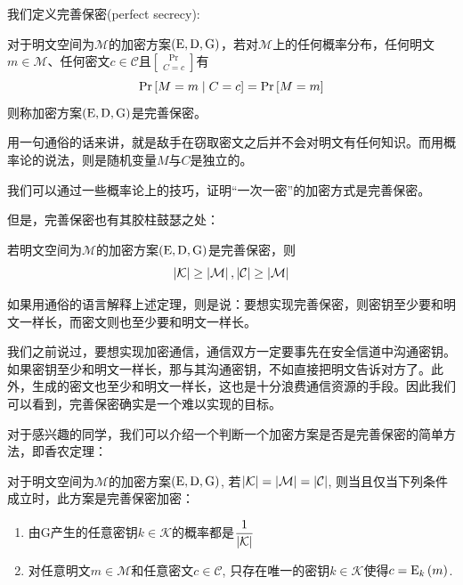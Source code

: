 我们定义完善保密(perfect secrecy):
\begin{Definition}
对于明文空间为$\mathcal{M}$的加密方案$\pth{\mathrm{E}, \mathrm{D}, \mathrm{G}}$，若对$\mathcal{M}$上的任何概率分布，任何明文$m\in\mathcal{M}$、任何密文$c\in\mathcal{C}$且$\Pr\brack{C=c}$有
\begin{equation}
    \Pr\brack{M=m\mid C=c}=\Pr\brack{M=m}
\end{equation}
则称加密方案$\pth{\mathrm{E}, \mathrm{D}, \mathrm{G}}$是完善保密。
\end{Definition}

用一句通俗的话来讲，就是敌手在窃取密文之后并不会对明文有任何知识。而用概率论的说法，则是随机变量$M$与$C$是独立的。\par
我们可以通过一些概率论上的技巧，证明“一次一密”的加密方式是完善保密。\par
但是，完善保密也有其胶柱鼓瑟之处：
\begin{theorem}
若明文空间为$\mathcal{M}$的加密方案$\pth{\mathrm{E}, \mathrm{D}, \mathrm{G}}$是完善保密，则
\begin{equation}
    \abs{\mathcal{K}}\geq\abs{\mathcal{M}}, \abs{\mathcal{C}}\geq\abs{\mathcal{M}}
\end{equation}
\end{theorem}

如果用通俗的语言解释上述定理，则是说：要想实现完善保密，则密钥至少要和明文一样长，而密文则也至少要和明文一样长。\par
我们之前说过，要想实现加密通信，通信双方一定要事先在安全信道中沟通密钥。如果密钥至少和明文一样长，那与其沟通密钥，不如直接把明文告诉对方了。此外，生成的密文也至少和明文一样长，这也是十分浪费通信资源的手段。因此我们可以看到，完善保密确实是一个难以实现的目标。\par
对于感兴趣的同学，我们可以介绍一个判断一个加密方案是否是完善保密的简单方法，即香农定理：
\begin{theorem}
对于明文空间为$\mathcal{M}$的加密方案$\pth{\mathrm{E}, \mathrm{D}, \mathrm{G}}$, 若$\abs{\mathcal{K}} = \abs{\mathcal{M}} = \abs{\mathcal{C}}$, 则当且仅当下列条件成立时，此方案是完善保密加密：
\begin{enumerate}
    \item 由$\mathrm{G}$产生的任意密钥$k\in\mathcal{K}$的概率都是$\ext\frac{1}{\abs{\mathcal{K}}}$
    \item 对任意明文$m\in\mathcal{M}$和任意密文$c\in\mathcal{C}$, 只存在唯一的密钥$k\in\mathcal{K}$使得$c=\E{k}{m}$.
\end{enumerate}
\end{theorem}

